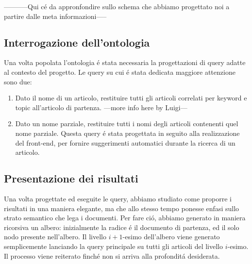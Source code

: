 \documentclass[11pt,twoside,a4paper]{article}
\begin{document}
-----------Qui c\'e da appronfondire sullo schema che abbiamo progettato noi a partire dalle meta informazioni-----

\subsection{Interrogazione dell'ontologia}
\label{subsec:query}
Una volta popolata l'ontologia \'e stata necessaria la progettazioni di query adatte al contesto del progetto. Le query su cui \'e stata dedicata maggiore attenzione sono due:
\begin{enumerate}
	\item Dato il nome di un articolo, restituire tutti gli articoli correlati per keyword e topic all'articolo di partenza. ---more info here by Luigi---
	\item Dato un nome parziale, restituire tutti i nomi degli articoli contenenti quel nome parziale. Questa query \'e stata progettata in seguito alla realizzazione del front-end, per fornire suggerimenti automatici durante la ricerca di un articolo.
\end{enumerate}

\subsection{Presentazione dei risultati}
\label{subsec:results}

Una volta progettate ed eseguite le query, abbiamo studiato come proporre i risultati in una maniera elegante, ma che allo stesso tempo ponesse enfasi sullo strato semantico che lega i documenti. Per fare ci\'o, abbiamo generato in maniera ricorsiva un albero: inizialmente la radice \'e il documento di partenza, ed il solo nodo presente nell'albero. Il livello $i+1$-esimo dell'albero viene generato semplicemente lanciando la query principale su tutti gli articoli del livello $i$-esimo. Il processo viene reiterato finch\'e non si arriva alla profondit\'a desiderata.
\end{document}
